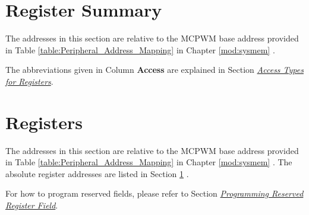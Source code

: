 \documentclass[main\_\_EN.tex]{subfiles}
\begin{document}
\hypertarget{mcpwm-reg-summ}{}
\section{Register Summary}
\label{section:register_summary}

The addresses in this section are relative to the MCPWM base address provided in Table \ref{table:Peripheral_Address_Mapping} in Chapter \ref{mod:sysmem} \textit{}.

The abbreviations given in Column \textbf{Access} are explained in Section \hyperref[glossary-access-types]{\textit{Access Types for Registers}}.





\section{Registers}

The addresses in this section are relative to the MCPWM base address provided in Table \ref{table:Peripheral_Address_Mapping} in Chapter \ref{mod:sysmem} \textit{}. The absolute register addresses are listed in Section \ref{section:register_summary} \textit{}. 

For how to program reserved fields, please refer to Section \hyperref[programming-reserved-field]{\textit{Programming Reserved Register Field}}.



\end{document}
